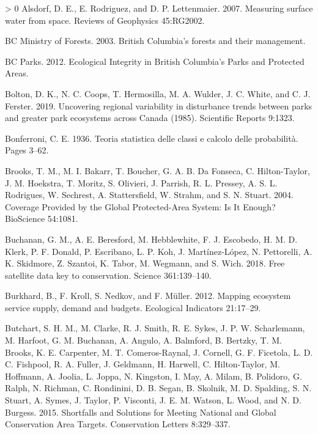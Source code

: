 \documentclass[11pt]{article}
\newlength{\cslhangindent}
\newenvironment{CSLReferences}[3] %
 {%
  \setlength{\parindent}{0pt}
  \ifodd #1 \everypar{\setlength{\hangindent}{\cslhangindent}}\ignorespaces\fi
  \ifnum #2 > 0
  \setlength{\parskip}{#2\baselineskip}
  \fi
 }%
 {}
\begin{document}
\hypertarget{refs}{}
\begin{CSLReferences}{1}{0}
\leavevmode\hypertarget{ref-alsdorf2007}{}%
Alsdorf, D. E., E. Rodriguez, and D. P. Lettenmaier. 2007. Measuring
surface water from space. Reviews of Geophysics 45:RG2002.

\leavevmode\hypertarget{ref-bcministryofforestsBritishColumbiaForests2003}{}%
BC Ministry of Forests. 2003. British Columbia's forests and their
management.

\leavevmode\hypertarget{ref-bcparks2012}{}%
BC Parks. 2012. Ecological Integrity in British Columbia's Parks and
Protected Areas.

\leavevmode\hypertarget{ref-boltonUncoveringRegionalVariability2019}{}%
Bolton, D. K., N. C. Coops, T. Hermosilla, M. A. Wulder, J. C. White,
and C. J. Ferster. 2019. Uncovering regional variability in disturbance
trends between parks and greater park ecosystems across Canada (1985).
Scientific Reports 9:1323.

\leavevmode\hypertarget{ref-bonferroni1936}{}%
Bonferroni, C. E. 1936. Teoria statistica delle classi e calcolo delle
probabilità. Pages 3--62.

\leavevmode\hypertarget{ref-brooks2004}{}%
Brooks, T. M., M. I. Bakarr, T. Boucher, G. A. B. Da Fonseca, C.
Hilton-Taylor, J. M. Hoekstra, T. Moritz, S. Olivieri, J. Parrish, R. L.
Pressey, A. S. L. Rodrigues, W. Sechrest, A. Stattersfield, W. Strahm,
and S. N. Stuart. 2004. Coverage Provided by the Global Protected-Area
System: Is It Enough? BioScience 54:1081.

\leavevmode\hypertarget{ref-buchanan2018}{}%
Buchanan, G. M., A. E. Beresford, M. Hebblewhite, F. J. Escobedo, H. M.
D. Klerk, P. F. Donald, P. Escribano, L. P. Koh, J. Martínez-López, N.
Pettorelli, A. K. Skidmore, Z. Szantoi, K. Tabor, M. Wegmann, and S.
Wich. 2018. Free satellite data key to conservation. Science
361:139--140.

\leavevmode\hypertarget{ref-burkhardMappingEcosystemService2012}{}%
Burkhard, B., F. Kroll, S. Nedkov, and F. Müller. 2012. Mapping
ecosystem service supply, demand and budgets. Ecological Indicators
21:17--29.

\leavevmode\hypertarget{ref-butchart2015}{}%
Butchart, S. H. M., M. Clarke, R. J. Smith, R. E. Sykes, J. P. W.
Scharlemann, M. Harfoot, G. M. Buchanan, A. Angulo, A. Balmford, B.
Bertzky, T. M. Brooks, K. E. Carpenter, M. T. Comeros-Raynal, J.
Cornell, G. F. Ficetola, L. D. C. Fishpool, R. A. Fuller, J. Geldmann,
H. Harwell, C. Hilton-Taylor, M. Hoffmann, A. Joolia, L. Joppa, N.
Kingston, I. May, A. Milam, B. Polidoro, G. Ralph, N. Richman, C.
Rondinini, D. B. Segan, B. Skolnik, M. D. Spalding, S. N. Stuart, A.
Symes, J. Taylor, P. Visconti, J. E. M. Watson, L. Wood, and N. D.
Burgess. 2015. Shortfalls and Solutions for Meeting National and Global
Conservation Area Targets. Conservation Letters 8:329--337.


\end{CSLReferences}
\end{document}

